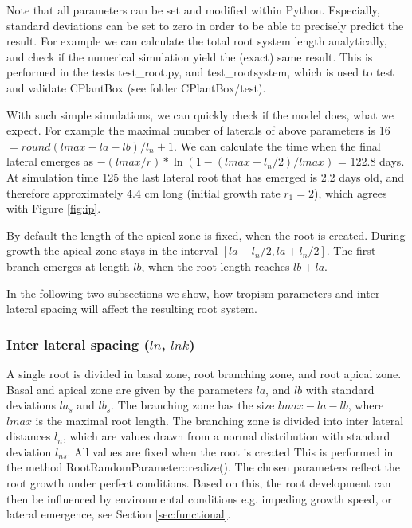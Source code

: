 Note that all parameters can be set and modified within Python. Especially, standard deviations can be set to zero in order to be able to precisely predict the result. For example we can calculate the total root system length analytically, and check if the numerical simulation yield the (exact) same result. This is performed in the tests test\_root.py, and test\_rootsystem, which is used to test and validate CPlantBox (see folder CPlantBox/test).

With such simple simulations, we can quickly check if the model does, what we expect. For example the maximal number of laterals of above parameters is 16 
$= round(lmax - la - lb)/l_n +  1$. We can calculate the time when the final lateral emerges as $-(lmax/r)*\ln(1-(lmax-l_n/2)/lmax)$ = 122.8 days. At simulation time 125 the last lateral root that has emerged is 2.2 days old, and therefore approximately 4.4 cm long (initial growth rate $r_1 = 2$), which agrees with Figure \ref{fig:ip}.

By default the length of the apical zone is fixed, when the root is created. During growth the apical zone stays in the interval $[la - l_n/2, la+l_n/2]$. The first branch emerges at length $lb$, when the root length reaches $lb +la$.

In the following two subsections we show, how tropism parameters and inter lateral spacing will affect the resulting root system.


\subsubsection*{Inter lateral spacing ($ln$, $lnk$)} \label{ssec:spacing}

A single root is divided in basal zone, root branching zone, and root apical zone. Basal and apical zone are given by the parameters $la$, and $lb$ with standard deviations $la_s$ and $lb_s$. The branching zone has the size $lmax-la-lb$, where $lmax$ is the maximal root length. The branching zone is divided into inter lateral distances $l_n$, which are values drawn from a normal distribution with standard deviation $l_{ns}$. All values are fixed when the root is created This is performed in the method RootRandomParameter::realize(). The chosen parameters reflect the root growth under perfect conditions. Based on this, the root development can then be influenced by environmental conditions e.g. impeding growth speed, or lateral emergence, see Section \ref{sec:functional}.

